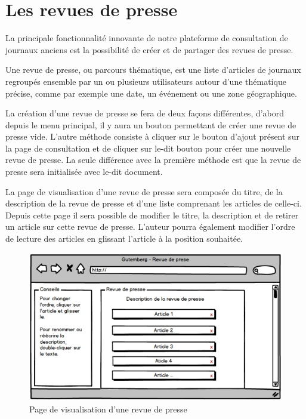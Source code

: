 \section{Les revues de presse}
\label{sec:revue}

La principale fonctionnalité innovante de notre plateforme de consultation de journaux anciens est la possibilité de créer et de partager des revues de presse.

Une revue de presse, ou parcours thématique, est une liste d'articles de journaux regroupés ensemble par un ou plusieurs utilisateurs autour d'une thématique précise, comme par exemple une date, un événement ou une zone géographique.

La création d'une revue de presse se fera de deux façons différentes, d'abord depuis le menu principal, il y aura un bouton permettant de créer une revue de presse vide. L'autre méthode consiste à cliquer sur le bouton d'ajout présent sur la page de consultation et de cliquer sur le-dit bouton pour créer une nouvelle revue de presse. La seule différence avec la première méthode est que la revue de presse sera initialisée avec le-dit document.

La page de visualisation d'une revue de presse sera composée du titre, de la description de la revue de presse et d'une liste comprenant les articles de celle-ci. Depuis cette page il sera possible de modifier le titre, la description et de retirer un article sur cette revue de presse. L'auteur pourra également modifier l'ordre de lecture des articles en glissant l'article à la position souhaitée.

\begin{figure}[H]
    \centering
    \includegraphics[width=\textwidth]{figures/revue.png}
    \caption{Page de visualisation d'une revue de presse}
    \label{fig:revue}
\end{figure}

